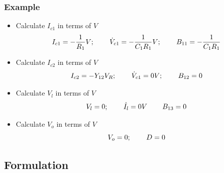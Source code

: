 \documentclass{beamer}
\begin{document}
\begin{frame}
\frametitle{Example}
\begin{small}
\begin{itemize}
\item Calculate $I_{c1}$ in terms of $V$\\
\begin{equation}
I_{c1}=-\frac{1}{R_1}V;\hspace{.3in} \dot{V}_{c1}=-\frac{1}{C_1R_1}V;\hspace{.3in} B_{11}=-\frac{1}{C_1R_1}
\end{equation}

\item Calculate $I_{c2}$ in terms of $V$\\
\begin{equation}
I_{c2}=-Y_{12}V_{R};\hspace{.3in} \dot{V}_{c1}=0 V;\hspace{.3in} B_{12}=0
\end{equation}
\item Calculate $V_{l}$ in terms of $V$\\
\begin{equation}
V_{l}=0;\hspace{.3in} \dot{I}_{l}=0V \hspace{.3in} B_{13}=0
\end{equation}
\item Calculate $V_{o}$ in terms of $V$\\
\begin{equation}
V_o=0; \hspace{0.3in} D=0
\end{equation}
\end{itemize}
\end{small}
\end{frame}





\subsection*{Formulation}
\end{document}
